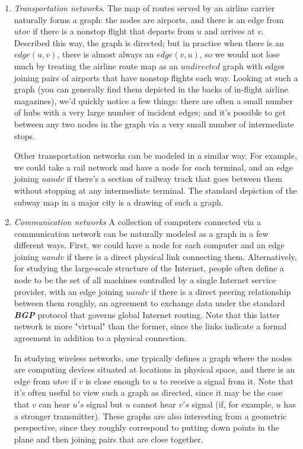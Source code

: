 \documentclass[12pt,a4paper]{book}
\begin{document}
\begin{enumerate}
\item \textit{Transportation networks}. The map of routes served by an airline carrier naturally forms a graph: the nodes are airports, and there is an edge from $u to v$ if there is a nonstop flight that departs from $u$ and arrives at $v$. Described this way, the graph is directed; but in practice when there is an $edge (u, v)$, there is almost always an $edge (v, u)$, so we would not lose much by treating the airline route map as an $undirected$ graph with edges joining pairs of airports that have nonstop flights each way. Looking at such a graph (you can generally find them depicted in the backs of in-flight airline magazines), we'd quickly notice a few things: there are often a small number of hubs with a very large number of incident edges; and it's possible to get between any two nodes in the graph via a very small number of intermediate stops.\par
Other transportation networks can be modeled in a similar way. For example, we could take a rail network and have a node for each terminal, and an edge joining $u and v$ if there's a section of railway track that goes between them without stopping at any intermediate terminal. The standard depiction of the subway map in a major city is a drawing of such a graph.
\item \textit{Communication networks}  A collection of computers connected via a communication network can be naturally modeled as a graph in a few different ways. First, we could have a node for each computer and an edge joining $u and v$ if there is a direct physical link connecting them. Alternatively, for studying the large-scale structure of the Internet, people often define a node to be the set of all machines controlled by a single Internet service provider, with an edge joining $u and v$ if there is a direct peering relationship between them roughly, an agreement to exchange data under the standard \textbf{\textit{BGP}} protocol that governs global Internet routing. Note that this latter network is more "virtual" than the former, since the links indicate a formal agreement in addition to a physical connection.\par
In studying wireless networks, one typically defines a graph where the nodes are computing devices situated at locations in physical space, and there is an edge from $u to v$ if $v$ is close enough to $u$ to receive a signal from it. Note that it's often useful to view such a graph as directed, since it may be the case that $v$ can hear $u's$ signal but $u$ cannot hear $v's$ signal (if, for example, $u$ has a stronger transmitter). These graphs are also interesting from a geometric perspective, since they roughly correspond to putting down points in the plane and then joining pairs that are close together.

\end{enumerate}
\end{document}
